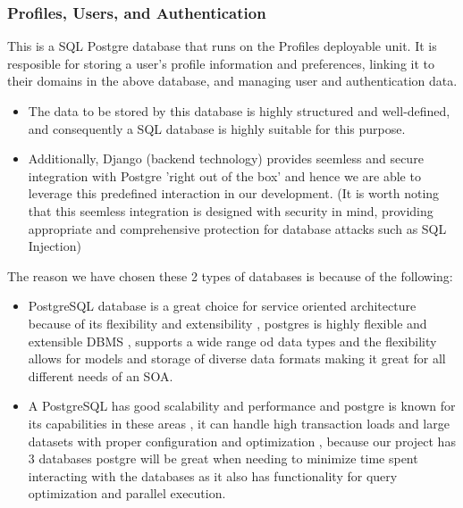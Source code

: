 \documentclass[12pt]{article}
\begin{document}
\subsubsection{Profiles, Users, and Authentication}
This is a SQL Postgre database that runs on the Profiles deployable unit. It is resposible for storing a user's profile information and preferences, linking it to their domains in the above database, and managing user and authentication data.
\begin{itemize}
    \item The data to be stored by this database is highly structured and well-defined, and consequently a SQL database is highly suitable for this purpose.
    \item Additionally, Django (backend technology) provides seemless and secure integration with Postgre 'right out of the box' and hence we are able to leverage this predefined interaction in our development. (It is worth noting that this seemless integration is designed with security in mind, providing appropriate and comprehensive protection for database attacks such as SQL Injection)
\end{itemize}
The reason we have chosen these 2 types of databases is because of the following:
\begin{itemize}
    \item PostgreSQL database is a great choice for service oriented architecture because of its flexibility and extensibility , postgres is highly flexible and extensible DBMS , supports a wide range od data types and the flexibility allows for models and storage of diverse data formats making it great for all different needs of an SOA.
    \item A PostgreSQL has good scalability and performance and postgre is known for its capabilities in these areas , it can handle high transaction loads and large datasets with proper configuration and optimization , because our project has 3 databases postgre will be great when needing to minimize time spent interacting with the databases as it also has functionality for query optimization and parallel execution.
\end{itemize}
\end{document}
